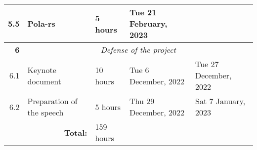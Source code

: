 \documentclass{standalone}
\begin{document}
\begin{tabular}{|r|llll|}
    5.5                                                           & \multicolumn{1}{l|}{Pola-rs}                                    & \multicolumn{1}{l|}{5 hours}                                   & \multicolumn{1}{l|}{Tue 21 February, 2023}                  &                                                              \\ \hline
    \textbf{6}                                                    & \multicolumn{4}{c|}{\textit{Defense of the project}}                                                                                                                                                                                                          \\ \hline
    6.1                                                           & \multicolumn{1}{l|}{Keynote document}                           & \multicolumn{1}{l|}{10 hours}                                  & \multicolumn{1}{l|}{Tue 6 December, 2022}                   & Tue 27 December, 2022                                        \\ \hline
    6.2                                                           & \multicolumn{1}{l|}{Preparation of the speech}                  & \multicolumn{1}{l|}{5 hours}                                   & \multicolumn{1}{l|}{Thu 29 December, 2022}                  & Sat 7 January, 2023                                          \\ \hline
    \multicolumn{2}{|r|}{\cellcolor[HTML]{C0C0C0}\textbf{Total:}} & \multicolumn{1}{l|}{159 hours}                                                                                                                                                                                                                                \\ \cline{1-3}
\end{tabular}
\end{document}
